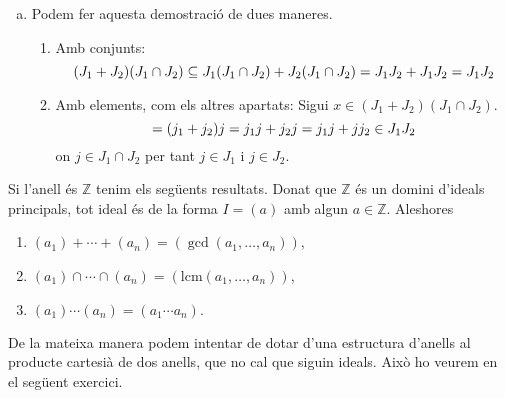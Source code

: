 \documentclass[../main.tex]{subfiles}
\begin{document}
\begin{sol}
\begin{enumerate}[(a)]
    \item Podem fer aquesta demostració de dues maneres.
    \begin{enumerate}[(1)]
        \item Amb conjunts:
        \begin{equation}
            \notag
            (J_1+J_2)(J_1\cap J_2) \subseteq J_1(J_1\cap J_2)+J_2(J_1\cap J_2) = J_1J_2+J_1J_2=J_1J_2
        \end{equation}
        \item Amb elements, com els altres apartats: Sigui $x\in (J_1+J_2)(J_1 \cap J_2)$.
        \begin{equation}
            \notag =(j_1+j_2)j=j_1j+j_2j=j_1j+jj_2 \in J_1J_2
        \end{equation}
        on $j\in J_1\cap J_2$ per tant $j\in J_1$ i $j\in J_2$.
    \end{enumerate}
\end{enumerate}
\end{sol}

\begin{ej}
Si l'anell és $\mathbb{Z}$ tenim els següents resultats. Donat que $\mathbb{Z}$ és un domini d'ideals principals, tot ideal és de la forma $I = (a)$ amb algun $a\in \mathbb{Z}$. Aleshores
\begin{enumerate}[(1)]
    \item $(a_1)+\cdots+(a_n) = (\gcd(a_1,\ldots,a_n))$,
    \item $(a_1)\cap\cdots\cap (a_n)  = (\mathrm{lcm}(a_1,\ldots,a_n))$,
    \item $(a_1)\cdots(a_n) = (a_1\cdots a_n).$
\end{enumerate}
\end{ej}

De la mateixa manera podem intentar de dotar d'una estructura d'anells al producte cartesià de dos anells, que no cal que siguin ideals. Això ho veurem en el següent exercici.
\end{document}
